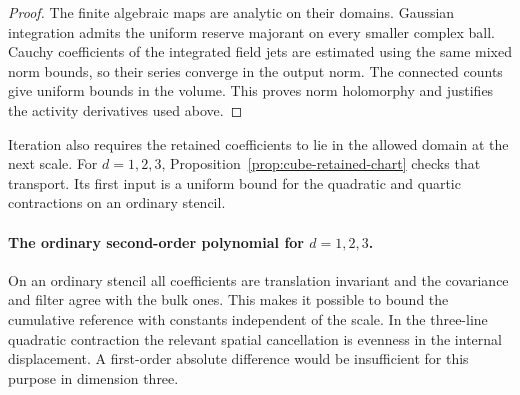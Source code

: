 \documentclass[11pt]{article}
\theoremstyle{definition}
\begin{document}
\begin{proof}
The finite algebraic maps are analytic on their domains.
Gaussian integration admits the uniform reserve majorant
on every smaller complex ball. Cauchy coefficients of
the integrated field jets are estimated using the same
mixed norm bounds, so their series converge in the
output norm. The connected counts give uniform bounds
in the volume. This proves norm holomorphy and justifies
the activity derivatives used above.
\end{proof}

Iteration also requires the retained coefficients to lie in the
allowed domain at the next scale. For \(d=1,2,3\),
Proposition~\ref{prop:cube-retained-chart} checks that transport.
Its first input is a uniform bound for the quadratic and quartic
contractions on an ordinary stencil.

\paragraph{The ordinary second-order polynomial for \(d=1,2,3\).}
On an ordinary stencil all coefficients are translation invariant
and the covariance and filter agree with the bulk ones. This makes
it possible to bound the cumulative reference with constants
independent of the scale. In the three-line quadratic contraction
the relevant spatial cancellation is evenness in the internal
displacement. A first-order absolute difference would be
insufficient for this purpose in dimension three.
\end{document}
